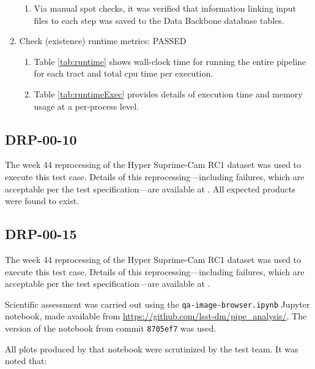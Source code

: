 \documentclass[DM,STR,toc]{lsstdoc}
\begin{document}
\begin{enumerate}
{\begin{enumerate}
      \item{Via manual spot checks, it was verified that information linking input files to each step was saved to the Data Backbone database tables.}
    \end{enumerate}
  }

  \item{Check (existence) runtime metrics: PASSED

    \begin{enumerate}
      \item{Table \ref{tab:runtime} shows wall-clock time for running the entire pipeline for each tract and total cpu time per execution.}
      \item{Table \ref{tab:runtimeExec} provides details of execution time and memory usage at a per-process level.}
    \end{enumerate}
  }
\end{enumerate}

\subsection{DRP-00-10}
\label{sect:detail-drp-00-10}

The week 44 reprocessing of the Hyper Suprime-Cam RC1 dataset was used to execute this test case.
Details of this reprocessing---including failures, which are acceptable per the test specification---are available at .
All expected products were found to exist.

\subsection{DRP-00-15}
\label{sect:detail-drp-00-15}

The week 44 reprocessing of the Hyper Suprime-Cam RC1 dataset was used to execute this test case.
Details of this reprocessing---including failures, which are acceptable per the test specification---are available at .

Scientific assessment was carried out using the \texttt{qa-image-browser.ipynb} Jupyter notebook, made available from \url{https://github.com/lsst-dm/pipe_analysis/}.
The version of the notebook from commit \texttt{8705ef7} was used.

All plots produced by that notebook were scrutinized by the test team.
It was noted that:
\end{document}
